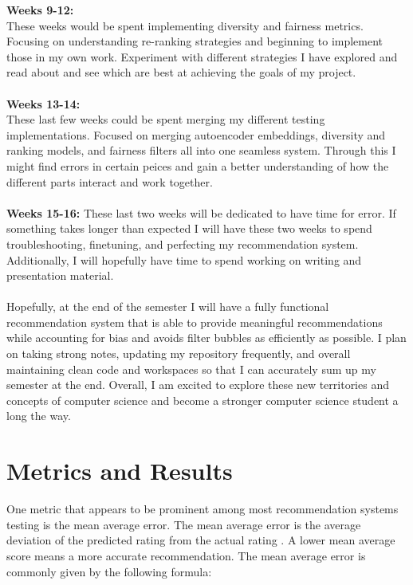 \documentclass[10pt,twocolumn]{article}
\begin{document}
\textbf{Weeks 9-12:}\\
These weeks would be spent implementing diversity and fairness metrics. Focusing on understanding re-ranking strategies and beginning to implement those in my own work. Experiment with different strategies I have explored and read about and see which are best at achieving the goals of my project.\\\\
\textbf{Weeks 13-14:}\\
These last few weeks could be spent merging my different testing implementations. Focused on merging autoencoder embeddings, diversity and ranking models, and fairness filters all into one seamless system. Through this I might find errors in certain peices and gain a better understanding of how the different parts interact and work together.\\\\
\textbf{Weeks 15-16:}
These last two weeks will be dedicated to have time for error. If something takes longer than expected I will have these two weeks to spend troubleshooting, finetuning, and perfecting my recommendation system. Additionally, I will hopefully have time to spend working on writing and presentation material.\\\\

\indent Hopefully, at the end of the semester I will have a fully functional recommendation system that is able to provide meaningful recommendations while accounting for bias and avoids filter bubbles as efficiently as possible. I plan on taking strong notes, updating my repository frequently, and overall maintaining clean code and workspaces so that I can accurately sum up my semester at the end. Overall, I am excited to explore these new territories and concepts of computer science and become a stronger computer science student a long the way. 

\section{Metrics and Results}

One metric that appears to be prominent among most recommendation systems testing is the mean average error. The mean average error is the average deviation of the predicted rating from the actual rating \cite{SarwarItemCF}\cite{BasilicoCFContent}. A lower mean average score means a more accurate recommendation. The mean average error is commonly given by the following formula:
\end{document}
